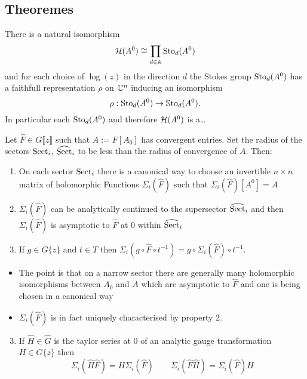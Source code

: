 \subsection{Theoremes}
\begin{thm}
  There is a natural isomorphism
  \[
    \mathcal{H}(A^0)\cong\prod_{d\in\mathbb{A}}\operatorname{Sto}_d(A^0)
  \]
  and for each choice of $\log(z)$ in the direction $d$ the Stokes group
  $\operatorname{Sto}_d(A^0)$ has a faithfull representation $\rho$ on $\mathbb{C}^n$ inducing an
  isomorphism
  \[
    \rho:\operatorname{Sto}_d(A^0)\to\operatorname{\mathbb{S}to}_d(A^0).
  \]
  In particular each $\operatorname{Sto}_d(A^0)$ and therefore $\mathcal{H}(A^0)$ is a\dots
\end{thm}
\begin{thm}
  Let $\hat{F}\in G\llbracket z\rrbracket$ such that $A:=F[A_0]$ has
  convergent entries.
  Set the radius of the sectors $\operatorname{Sect}_i$, $\widehat{\operatorname{Sect}}_i$ to be less than
  the radius of convergence of $A$.
  Then:
  \begin{enumerate}
    \item On each sector $\operatorname{Sect}_i$ there is a canonical way to choose an
      invertible $n\times n$ matrix of holomorphic Functions
      $\Sigma_i(\hat F)$ such that $\Sigma_i(\hat F)[A^0]=A$
    \item $\Sigma_i(\hat F)$ can be analytically continued to the supersector
      $\widehat{\operatorname{Sect}}_i$ and then $\Sigma_i(\hat F)$ is asymptotic to $\hat F$
      at $0$ within $\widehat{\operatorname{Sect}}_i$
    \item If $g\in G\{z\}$ and $t\in T$ then
      $\Sigma_i(g\circ\hat F \circ t^{-1})=g\circ\Sigma_i(\hat F)\circ t^{-1}$.
  \end{enumerate}
\end{thm}
\begin{itemize}
  \item The point is that on a narrow sector there are generally many
    holomorphic isomorphisms between $A_0$ and $A$ which are asymptotic to
    $\hat F$ and one is being chosen in a canonical way
  \item $\Sigma_i(\hat F)$ is in fact uniquely characterised by property 2.
\end{itemize}
\begin{prop}
  \begin{enumerate}
  \setcounter{enumi}{2}
  \item If $\hat H\in\hat G$ is the taylor series at $0$ of an analytic gauge
    transformation $H\in G\{z\}$ then
    \[
      \Sigma_i(\hat H \hat F)=H\Sigma_i(\hat F)
      \qquad
      \Sigma_i(\hat F \hat H)=\Sigma_i(\hat F)H
    \]
  \end{enumerate}
\end{prop}
